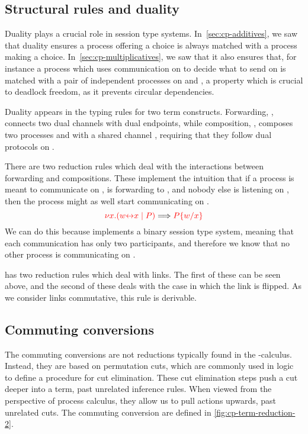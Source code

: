 \subsection{Structural rules and duality}
\label{sec:cp-duality}
Duality plays a crucial role in session type systems.
In~\cref{sec:cp-additives}, we saw that duality ensures a process offering a choice
is always matched with a process making a choice.
In~\cref{sec:cp-multiplicatives}, we saw that it also ensures that, for instance
a process which uses communication on  to decide what to send on  is
matched with a pair of independent processes on  and , a property
which is crucial to deadlock freedom, as it prevents circular dependencies. 

Duality appears in the typing rules for two \rcp term constructs.
Forwarding, , connects two dual channels with dual endpoints,
while composition, , composes two processes  and
 with a shared channel , requiring that they follow dual protocols
on .
\begin{center}
  \cpInfAx
  \cpInfCut
\end{center}
There are two reduction rules which deal with the interactions between
forwarding and compositions. These implement the intuition that if a process is
meant to communicate on ,  is forwarding to , and nobody else
is listening on , then the process might as well start communicating on
.
\[
  \tm{\cpCut{x}{\cpLink{w}{x}}{P}} \Longrightarrow \tm{\cpSub{w}{x}{P}} 
\]
We can do this because \rcp implements a binary session type system, meaning
that each communication has only two participants, and therefore we know that no
other process is communicating on .

 has two reduction rules which deal with links. The first of
these can be seen above, and the second of these deals with the case in which
the link is flipped.
As we consider links commutative, this rule is derivable.

\subsection{Commuting conversions}
\label{sec:cp-commuting-conversions}
The commuting conversions are not reductions typically found in the
\textpi-calculus.
Instead, they are based on permutation cuts, which are commonly used in logic to
define a procedure for cut elimination.
These cut elimination steps push a cut deeper into a term, past unrelated
inference rules.
When viewed from the perspective of process calculus, they allow us to pull
actions upwards, past unrelated cuts.
The commuting conversion are defined in \cref{fig:cp-term-reduction-2}.


